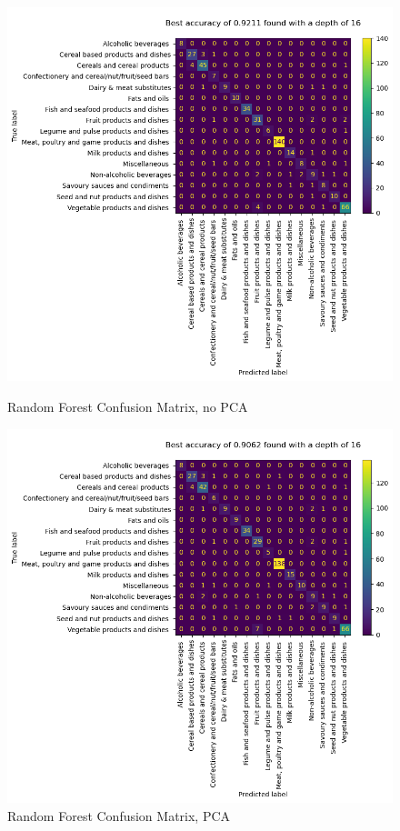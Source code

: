 \documentclass[12pt,a4paper]{article}
\begin{document}
    \begin{figure}[h]
        \centering
        \begin{minipage}{0.48\textwidth}
            \centering
            \includegraphics[width=\textwidth]{random-forest-conf-nopca} %
            \caption{Random Forest Confusion Matrix, no PCA}
            \label{fig:random-forest-conf-nopca}
        \end{minipage}\hfill
        \begin{minipage}{0.48\textwidth}
            \centering
            \includegraphics[width=\textwidth]{random-forest-conf-pca} %
            \caption{Random Forest Confusion Matrix, PCA}
            \label{fig:random-forest-conf-pca}
        \end{minipage}
    \end{figure}
\end{document}
